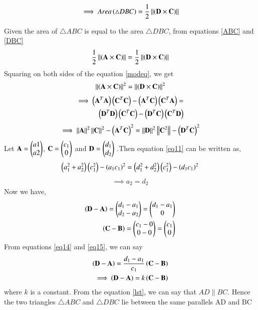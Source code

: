 \documentclass[journal,12pt,twocolumn]{IEEEtran}
\begin{document}
\begin{align}
    \label{DBC}
    \implies Area\left(\triangle DBC\right) = \frac{1}{2}\left\lVert\left(\mathbf{D} \times \mathbf{C}\right)\right\rVert
\end{align}
\item Given the area of $\triangle ABC$ is equal to the area $\triangle DBC$, from equations \eqref{ABC} and \eqref{DBC}
\begin{align}
    \label{modeq}
    \frac{1}{2}\left\lVert\left(\mathbf{A} \times \mathbf{C}\right)\right\rVert = \frac{1}{2}\left\lVert\left(\mathbf{D} \times \mathbf{C}\right)\right\rVert
\end{align}
Squaring on both sides of the equation \eqref{modeq}, we get
\begin{align}
    \left\lVert\left(\mathbf{A} \times \mathbf{C}\right)\right\rVert^2 = \left\lVert\left(\mathbf{D} \times \mathbf{C}\right)\right\rVert^2
\end{align}
\begin{equation}
\begin{align}
    \implies \left(\mathbf{A}^T\mathbf{A}\right)\left(\mathbf{C}^T\mathbf{C}\right) - \left(\mathbf{A}^T\mathbf{C}\right)\left(\mathbf{C}^T\mathbf{A}\right) =\\ \left(\mathbf{D}^T\mathbf{D}\right)\left(\mathbf{C}^T\mathbf{C}\right) - \left(\mathbf{D}^T\mathbf{C}\right)\left(\mathbf{C}^T\mathbf{D}\right)
\end{align}
\end{equation}
\begin{align}
    \label{eq11}
    \implies\left\lVert\mathbf{A}\right\rVert^2\left\lVert\mathbf{C}\right\rVert^2 - \left(\mathbf{A}^T\mathbf{C}\right)^2 = \left\lVert\mathbf{D}\right\rVert^2\left\lVert\mathbf{C}^2\right\rVert - \left(\mathbf{D}^T\mathbf{C}\right)^2 
\end{align}
Let $\mathbf{A}=\begin{pmatrix}a1\\a2\end{pmatrix}$, $\mathbf{C}=\begin{pmatrix}c_1\\0\end{pmatrix}$ and $\mathbf{D}=\begin{pmatrix}d_1\\d_2\end{pmatrix}$ .Then equation \eqref{eq11} can be written as,
\begin{align}
    \label{lbo}
    \left(a_1^2+a_2^2\right)\left(c_1^2\right)-\left(a_1c_1\right)^2 = \left(d_1^2+d_2^2\right)\left(c_1^2\right) - \left(d_1c_1\right)^2
\end{align}
\begin{align}
    \implies a_2 = d_2
\end{align}
Now we have,
\begin{align}
    \label{eq14}
    \left(\mathbf{D}-\mathbf{A}\right)=\begin{pmatrix}d_1-a_1\\d_2-a_2\end{pmatrix} = \begin{pmatrix}d_1-a_1\\0\end{pmatrix}\\ 
    \label{eq15}
    \left(\mathbf{C}-\mathbf{B}\right) = \begin{pmatrix}c_1-0 \\ 0-0\end{pmatrix} = \begin{pmatrix}c_1 \\ 0\end{pmatrix}
\end{align}
From equations \eqref{eq14} and \eqref{eq15}, we can say
\begin{align}
    \left(\mathbf{D}-\mathbf{A}\right)=\frac{d_1-a_1}{c_1}\left(\mathbf{C}-\mathbf{B}\right)\\
    \label{lst}
    \implies \left(\mathbf{D}-\mathbf{A}\right)=k\left(\mathbf{C}-\mathbf{B}\right)
\end{align}
where $k$ is a constant. From the equation \eqref{lst}, we can say that $AD \parallel BC$. Hence the two triangles $\triangle ABC$ and $\triangle DBC$ lie between the same parallels AD and BC
\end{document}
